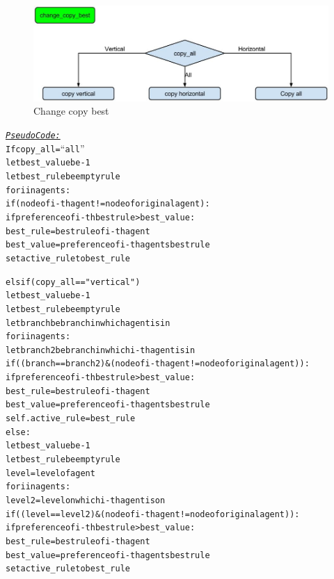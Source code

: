 \documentclass[a4paper]{article}
\begin{document}
\begin{figure}[!ht]
\includegraphics[width =\textwidth]{change_copy_best.jpg}
\caption{Change copy best}
\label{change_copy_best}
\end{figure}
\begin{alltt}
 \underline{\textit{Pseudo Code:}}
If copy_all = “all”
    let best_value be  -1
            let best_rule be empty rule
            for i in agents:
                if (node of i-th agent != node of original agent):
                        if preference of i-th best rule> best_value:
                            best_rule = best rule of i-th agent
                            best_value = preference of i-th agents best rule
            set active_rule  to  best_rule

elsif (copy_all == "vertical")
            let best_value be -1
            let best_rule be empty rule
            let branch be branch in which agent is in 
            for i in agents:
                let branch2 be branch in which  i-th agent is in  
                if ((branch == branch2) &(node of i-th agent != node of original agent)):
                        if preference of i-th best rule > best_value:
                                best_rule = best rule of i-th agent
                                best_value = preference of i-th agents best rule
            self.active_rule = best_rule
    else:
            let best_value be -1
            let best_rule be empty rule
            level = level of agent
            for i in agents:
                level2 = level on which i-th agent is on 
                if ((level == level2) & (node of i-th agent != node of original agent)):
                        if preference of i-th best rule > best_value:
                                best_rule = best rule of i-th agent
                                best_value = preference of i-th agents best rule
             set active_rule to  best_rule
\end{alltt}


\clearpage
\end{document}
